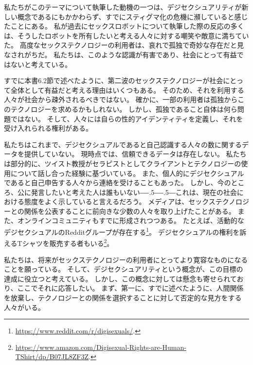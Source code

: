 \documentclass[paper=a4,book,openany]{jlreq}
\def\DDASH{―\kern-.5\zw―\kern-.5\zw―} %
\begin{document}
私たちがこのテーマについて執筆した動機の一つは、デジセクシュアリティが新しい概念であるにもかかわらず、すでにスティグマ化の危機に瀕していると感じたことにある。
私が過去にセックスロボットについて執筆した際の反応の多くは、そうしたロボットを所有したいと考える人々に対する嘲笑や敵意に満ちていた。
高度なセックステクノロジーの利用者は、哀れで孤独で奇妙な存在だと見なされがちだ。
私たちは、このような認識が有害であり、社会にとって有益ではないと考えている。

すでに本書6.2節で述べたように、第二波のセックステクノロジーが社会にとって全体として有益だと考える理由はいくつもある。
そのため、それを利用する人々が社会から疎外されるべきではない。
確かに、一部の利用者は孤独からこのテクノロジーを求めるかもしれない。
しかし、孤独であること自体は何ら問題ではない。
そして、人々には自らの性的アイデンティティを定義し、それを受け入れられる権利がある。

私たちはこれまで、デジセクシュアルであると自己認識する人々の数に関するデータを提供していない。
現時点では、信頼できるデータは存在しない。
私たちは部分的に、ツイスト教授がセラピストとしてクライアントとテクノロジーの使用について話し合った経験に基づいている。
また、個人的にデジセクシュアルであると自己申告する人々から連絡を受けることもあった。
しかし、今のところ、公に発言したいと考えた人は誰もいない{\DDASH}これは、現在の社会における態度をよく示していると言えるだろう。
メディアは、セックステクノロジーとの関係を公表することに前向きな少数の人々を取り上げたことがある\citep{haas17:_chines_man_marries_robot_he_built_himsel,jozuka18:_beyon_dimen,weiss19:_these_men_love_their_sex}。
また、オンラインコミュニティもすでに形成されつつある。
たとえば、活動的なデジセクシュアルのRedditグループが存在する\footnote{\url{https://www.reddit.com/r/digisexuals/}.}。
デジセクシュアルの権利を訴えるTシャツを販売する者もいる\footnote{\url{https://www.amazon.com/Digisexual-Rights-are-Human-TShirt/dp/B07JL8ZF3Z}.}。

私たちは、将来がセックステクノロジーの利用者にとってより寛容なものになることを願っている。
そして、デジセクシュアリティという概念が、この目標の達成に役立つと考えている。
しかし、この概念に対しては懸念も寄せられており、ここでそれに応答したい。
まず、第一に、すでに述べたように、人間関係を放棄し、テクノロジーとの関係を選択することに対して否定的な見方をする人々がいる。
\end{document}
